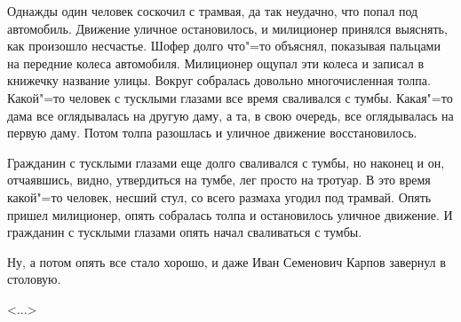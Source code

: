 Однажды один человек соскочил с трамвая, да так неудачно, что попал под автомобиль. Движение уличное остановилось, и милиционер принялся выяснять, как произошло несчастье. Шофер долго что"=то объяснял, показывая пальцами на передние колеса автомобиля. Милиционер ощупал эти колеса и записал в книжечку название улицы. Вокруг собралась довольно многочисленная толпа. Какой"=то человек с тусклыми глазами все время сваливался с тумбы. Какая"=то дама все оглядывалась на другую даму, а та, в свою очередь, все оглядывалась на первую даму. Потом толпа разошлась и уличное движение восстановилось.

Гражданин с тусклыми глазами еще долго сваливался с тумбы, но наконец и он, отчаявшись, видно, утвердиться на тумбе, лег просто на тротуар. В это время какой"=то человек, несший стул, со всего размаха угодил под трамвай. Опять пришел милиционер, опять собралась толпа и остановилось уличное движение. И гражданин с тусклыми глазами опять начал сваливаться с тумбы.

Ну, а потом опять все стало хорошо, и даже Иван Семенович Карпов завернул в столовую.

\vspace{1em}
\hfill <...>
